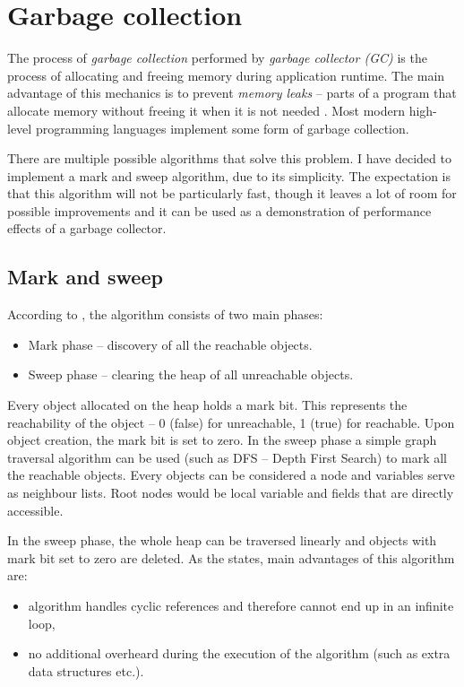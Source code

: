 \documentclass[thesis=M,english]{FITthesis}[2019/12/23]
\begin{document}
\section{Garbage collection}
The process of \textit{garbage collection} performed by \textit{garbage collector (GC)} is the process of allocating and freeing
memory during application runtime. The main advantage of this mechanics is to prevent \textit{memory leaks} -- parts of a program
that allocate memory without freeing it when it is not needed \cite{memleaks-raygun}. Most modern high-level programming languages
implement some form of garbage collection.

There are multiple possible algorithms that solve this problem. I have decided to implement a mark and sweep algorithm, due to
its simplicity. The expectation is that this algorithm will not be particularly fast, though it leaves a lot of room for possible
improvements and it can be used as a demonstration of performance effects of a garbage collector.

\subsection{Mark and sweep}
According to \cite{gc-ms}, the algorithm consists of two main phases:
\begin{itemize}
	\item Mark phase -- discovery of all the reachable objects.
	\item Sweep phase -- clearing the heap of all unreachable objects.
\end{itemize}

Every object allocated on the heap holds a mark bit. This represents the reachability of the object -- 0 (false) for
unreachable, 1 (true) for reachable. Upon object creation, the mark bit is set to zero. In the sweep phase a simple
graph traversal algorithm can be used (such as DFS -- Depth First Search) to mark all the reachable objects. Every
objects can be considered a node and variables serve as neighbour lists. Root nodes would be local variable and fields
that are directly accessible.

In the sweep phase, the whole heap can be traversed linearly and objects with mark bit set to zero are deleted. As the \cite{gc-ms}
states, main advantages of this algorithm are:
\begin{itemize}
	\item algorithm handles cyclic references and therefore cannot end up in an infinite loop,
	\item no additional overheard during the execution of the algorithm (such as extra data structures etc.).
\end{itemize}
\end{document}
